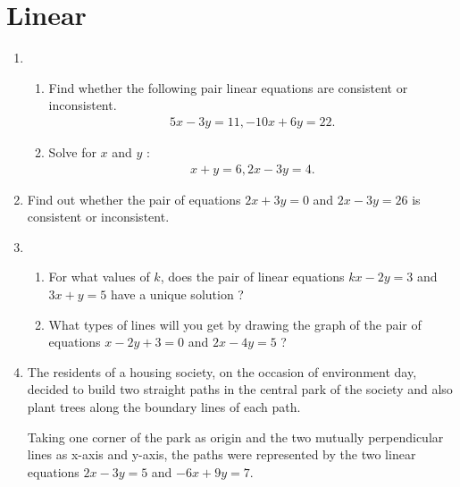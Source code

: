 \documentclass{article}
\begin{document}
\section*{\center Linear}
\begin{enumerate}
\item 
\begin{enumerate}
    \item Find whether the following pair linear equations are consistent or 
inconsistent.
\begin{align}
        5x-3y=11, -10x+6y=22.
\end{align}
    \item Solve for $x$ and $y$ :
\begin{align}
     x+y=6, 2x-3y=4.
\end{align}   
 \end{enumerate}
 \item Find out whether the pair of equations $2x+3y=0$ and $2x-3y=26$ is consistent or inconsistent.
\item 
\begin{enumerate}
    \item For what values of $k$, does the pair of linear equations $kx-2y=3$ and $3x+y=5$ have a unique solution ?
    \item What types of lines will you get by drawing the graph of the pair of equations $x-2y+3=0$ and $2x-4y=5$ ?
\end{enumerate}
\item The residents of a housing society, on the occasion of environment day, decided to build two straight paths in the central park of the society and also plant trees along the boundary lines of each path.

Taking one corner of the park as origin and the two mutually perpendicular lines as x-axis and y-axis, the paths were represented by the two linear equations $2x-3y=5$ and $-6x+9y=7$.


\end{enumerate}
\end{document}
